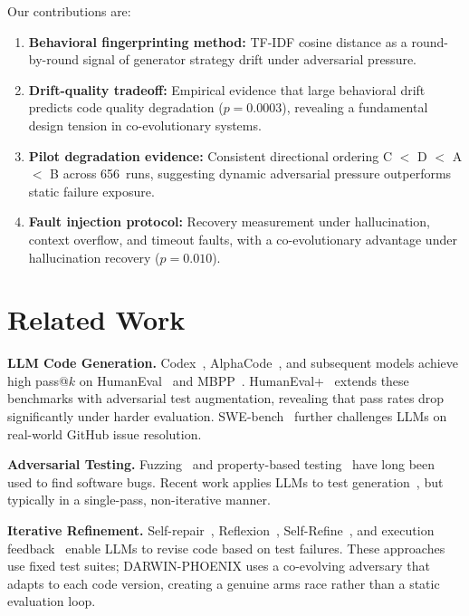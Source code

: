 \documentclass[11pt,letterpaper]{article}
\begin{document}
Our contributions are:
\begin{enumerate}
  \item \textbf{Behavioral fingerprinting method:} TF-IDF cosine distance as a
        round-by-round signal of generator strategy drift under adversarial
        pressure.
  \item \textbf{Drift-quality tradeoff:} Empirical evidence that large behavioral
        drift predicts code quality degradation ($p=0.0003$), revealing a
        fundamental design tension in co-evolutionary systems.
  \item \textbf{Pilot degradation evidence:} Consistent directional ordering
        C $<$ D $<$ A $<$ B across 656~runs, suggesting dynamic adversarial
        pressure outperforms static failure exposure.
  \item \textbf{Fault injection protocol:} Recovery measurement under
        hallucination, context overflow, and timeout faults, with a
        co-evolutionary advantage under hallucination recovery ($p=0.010$).
\end{enumerate}

\section{Related Work}

\textbf{LLM Code Generation.}
Codex~\cite{chen2021}, AlphaCode~\cite{li2022}, and subsequent models achieve
high pass@$k$ on HumanEval~\cite{chen2021} and MBPP~\cite{austin2021}.
HumanEval+~\cite{liu2023} extends these benchmarks with adversarial test
augmentation, revealing that pass rates drop significantly under harder
evaluation. SWE-bench~\cite{jimenez2024} further challenges LLMs on real-world
GitHub issue resolution.

\textbf{Adversarial Testing.}
Fuzzing~\cite{bohme2021} and property-based testing~\cite{claessen2000} have
long been used to find software bugs. Recent work applies LLMs to test
generation~\cite{liu2023}, but typically in a single-pass, non-iterative
manner.

\textbf{Iterative Refinement.}
Self-repair~\cite{olausson2023}, Reflexion~\cite{shinn2023},
Self-Refine~\cite{madaan2023}, and execution feedback~\cite{chen2021} enable
LLMs to revise code based on test failures. These approaches use fixed test
suites; DARWIN-PHOENIX uses a co-evolving adversary that adapts to each code
version, creating a genuine arms race rather than a static evaluation loop.
\end{document}
